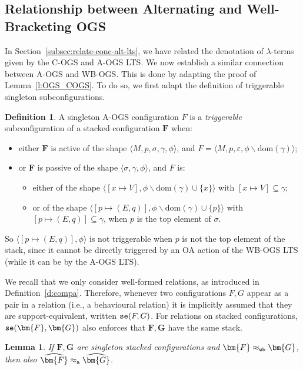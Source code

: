 \documentclass[11pt,a4paper]{amsart}
\theoremstyle{plain}
\theoremstyle{definition}
\theoremstyle{defC}
\theoremstyle{thmC}
\theoremstyle{plain}
\numberwithin{equation}{section}
\newcommand{\stt}{\sigma}
\newcommand{\AOGS}{\mbox{{\rm A-OGS}}\xspace}      %
\newcommand{\COGS}{\mbox{{\rm C-OGS}}\xspace}      %
\newcommand{\WBOGS}{\mbox{{\rm WB-OGS}}\xspace}      %
\newcommand{\okC}[2]{{\tt se}(#1,#2)}  %
\newcommand{\rmm}[1]{{\tt{\lowercase{#1}}}}
\newcommand{\genwb}[1]{\mathrel{\approx_{\rmm{\lowercase{#1}}}}}       %
\newcommand{\wbA}{\genwb{A}}       %
\newcommand{\wbWB}{\genwb{wb}}       %
\newcommand{\FF}{F}
\newcommand{\GG}{G}
\newcommand{\FFb}{{\bm{\FF}}} %
\newcommand{\GGb}{{\bm{\GG}}} %
\newcommand{\es}{\eraseStack}
\newcommand{\dom}[1]{\mathrm{dom}(#1)}
\newcommand{\emptymap}{\varepsilon}
\newcommand{\pmap}[2]{[#1 \mapsto #2]}
\newcommand{\conf}[1]{\langle #1\rangle}
\newcommand{\eraseStack}[1]{\widehat{#1}}
\theoremstyle{plain}
\newtheorem{lemma}[thm]{Lemma}
\theoremstyle{definition}
\newtheorem{definition}[thm]{Definition}
\begin{document}
\subsection{Relationship between Alternating and Well-Bracketing OGS}
\label{subsec:relate-alt-wb-lts}

In Section~\ref{subsec:relate-conc-alt-lts},
we have related the denotation of $\lambda$-terms
given by the \COGS and \AOGS LTS.
We now establish a similar connection
between \AOGS and \WBOGS.
This is done by adapting the proof of Lemma~\ref{l:OGS_COGS}.
To do so, we first adapt the definition of
triggerable singleton subconfigurations.

\begin{definition}
A singleton \AOGS configuration $\FF$ is 
a \emph{triggerable} subconfiguration of a stacked configuration $\FFb$ when:
\begin{itemize}
  \item either $\FFb$ is active of the shape
  $\conf{M,p,\stt,\gamma,\phi}$,
  and $\FF = \conf{M,p,\emptymap,\phi \backslash{\dom{\gamma}}}$;
  \item or $\FFb$ is passive of the shape
  $\conf{\stt,\gamma,\phi}$,
  and $\FF$ is:
  \begin{itemize}
    \item either of the shape
    $\conf{\pmap{x}{V},\phi \backslash{\dom{\gamma}} \cup\{x\}}$
    with $\pmap{x}{V} \subseteq \gamma$;
    \item or of the shape $\conf{\pmap{p}{(E,q)},\phi \backslash{\dom{\gamma}} \cup\{p\}}$
    with $\pmap{p}{(E,q)} \subseteq \gamma$,
    when $p$ is the top element of $\stt$.
  \end{itemize}
\end{itemize}
\end{definition}
\noindent
So
$\conf{\pmap{p}{(E,q)},\phi}$ is not triggerable 
when $p$ is not the top element of the stack,
since it cannot be directly triggered by an OA action of the \WBOGS LTS
(while it can be by the \AOGS LTS).

We recall that we only consider well-formed relations, 
as introduced in Definition~\ref{d:compa}.
Therefore, whenever two configurations $\FF,\GG$ appear as
a pair in a relation (i.e., a behavioural relation) 
it is implicitly assumed that they are support-equivalent, written
$\okC{\FF}{\GG}$.
For relations on stacked configurations, $\okC{\FFb}{\GGb}$ 
also enforces that $\FFb,\GGb$ have the same stack.

\begin{lemma}
\label{l:AOGS_WBOGS}
If $\FFb, \GGb$ are singleton stacked configurations and 
$\FFb \wbWB \GGb$, then also $\es\FFb \wbA \es\GGb$. 
\end{lemma}
\end{document}
